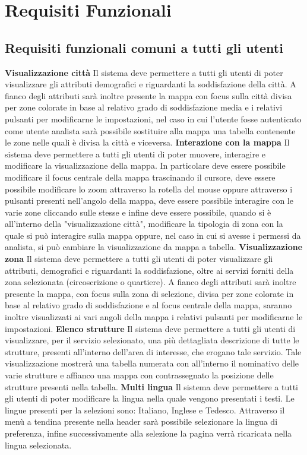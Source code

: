 \chapter{Requisiti Funzionali} 
    \section{Requisiti funzionali comuni a tutti gli utenti}
        \begin{rfList}
            \rfItem \textbf{Visualizzazione città} Il sistema deve permettere a tutti gli utenti di poter visualizzare gli attributi demografici e riguardanti la soddisfazione della città. A fianco degli attributi sarà inoltre presente la mappa con focus sulla città divisa per zone colorate in base al relativo grado di soddisfazione media e i relativi pulsanti per modificarne le impostazioni, nel caso in cui l'utente fosse autenticato come utente analista sarà possibile sostituire alla mappa una tabella contenente le zone nelle quali è divisa la città e viceversa.
            \rfItem \textbf{Interazione con la mappa} Il sistema deve permettere a tutti gli utenti di poter muovere, interagire e modificare la visualizzazione della mappa. In particolare deve essere possibile modificare il focus centrale della mappa trascinando il cursore, deve essere possibile modificare lo zoom attraverso la rotella del mouse oppure attraverso i pulsanti presenti nell'angolo della mappa, deve essere possibile interagire con le varie zone cliccando sulle stesse e infine deve essere possibile, quando si è all'interno della "visualizzazione città", modificare la tipologia di zona con la quale si può interagire sulla mappa oppure, nel caso in cui si avesse i permessi da analista, si può cambiare la visualizzazione da mappa a tabella.
            \rfItem \textbf{Visualizzazione zona} Il sistema deve permettere a tutti gli utenti di poter visualizzare gli attributi, demografici e riguardanti la soddisfazione, oltre ai servizi forniti della zona selezionata (circoscrizione o quartiere). A fianco degli attributi sarà inoltre presente la mappa, con focus sulla zona di selezione, divisa per zone colorate in base al relativo grado di soddisfazione e al focus centrale della mappa, saranno inoltre visualizzati ai vari angoli della mappa i relativi pulsanti per modificarne le impostazioni.
            \rfItem \textbf{Elenco strutture} Il sistema deve permettere a tutti gli utenti di visualizzare, per il servizio selezionato, una più dettagliata descrizione di tutte le strutture, presenti all'interno dell'area di interesse, che erogano tale servizio. Tale visualizzazione mostrerà una tabella numerata con all'interno il nominativo delle varie strutture e affianco una mappa con contrassegnato la posizione delle strutture presenti nella tabella.
            \rfItem \textbf{Multi lingua} Il sistema deve permettere a tutti gli utenti di poter modificare la lingua nella quale vengono presentati i testi. Le lingue presenti per la selezioni sono: Italiano, Inglese e Tedesco. Attraverso il menù a tendina presente nella header sarà possibile selezionare la lingua di preferenza, infine successivamente alla selezione la pagina verrà ricaricata nella lingua selezionata.
        \end{rfList}
